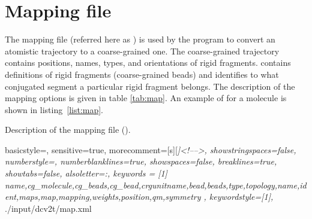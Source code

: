 \section{Mapping file}
\label{sec:xmlmap}

The mapping file (referred here as \xmlcsg) is used by the program \ctpmap to convert an atomistic trajectory to a coarse-grained one. The coarse-grained trajectory contains positions, names, types, and orientations of rigid fragments. \xmlcsg contains definitions of rigid fragments (coarse-grained beads) and identifies to what conjugated segment a particular rigid fragment belongs. The description of the mapping options is given in table \ref{tab:map}. An example of \xmlcsg for a \dcvt molecule is shown in listing~\ref{list:map}. 

\begin{table}[ht]
\label{tab:map}
\caption{Description of the \xml mapping file (\xmlcsg).}
 {\footnotesize }
\end{table}
\vfill
 {
   basicstyle=\ttfamily\scriptsize,
   sensitive=true,
   morecomment=[s][\color{gray}\rmfamily\itshape]{<!--}{-->}, 
   showstringspaces=false,
   numberstyle=\scriptsize,
   numberblanklines=true,
   showspaces=false,
   breaklines=true,
   showtabs=false,
   alsoletter={:},
   keywords = [1]
   { name,cg_molecule,cg_beads,cg_bead,crgunitname,bead,beads,type,topology,name,ident,maps,map,mapping,weights,position,qm,symmetry },
   keywordstyle={[1]\color{blue}},
}
%
{./input/dcv2t/map.xml}

\clearpage